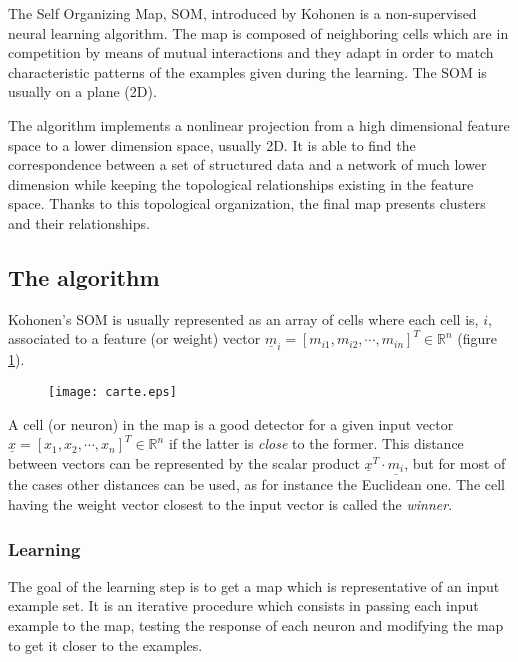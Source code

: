 The Self Organizing Map, SOM, introduced by Kohonen is a
non-supervised neural
learning algorithm. The map is composed of neighboring cells which are
in competition by means of mutual interactions and they adapt in order
to match characteristic patterns of the examples given during the
learning. The SOM is usually on a plane (2D).

The algorithm implements a nonlinear projection from a high
dimensional feature space to a lower dimension space, usually 2D. It
is able to find the correspondence between a set of structured data
and a network of much lower dimension while keeping the topological
relationships existing in the feature space. Thanks to this
topological organization, the final map presents clusters and their
relationships. 

\subsection{The algorithm}
Kohonen's SOM is usually represented as an array of cells where each
cell is, $i$, associated to a feature (or weight) vector  $\underline m_i = \left[m_{i1},m_{i2},\cdots,m_{in}\right]^T\in
\mathbb{R}^n$ (figure \ref{carte}).\\
\begin{figure}
\center
\texttt{[image: carte.eps]}
\label{carte}
\end{figure}

A cell (or neuron) in the map is a good detector for a given input
vector $\underline x = \left[x_{1},x_{2},\cdots,x_{n}\right]^T\in
\mathbb{R}^n$ if the latter is {\em close} to the former. This
distance between vectors can be represented by the scalar product 
$\underline{x}^T\cdot\underline{m_i}$, but for most of the cases other
distances can be used, as for instance the Euclidean one. The cell
having the weight vector closest to the input vector is called the
{\em winner}.

\subsubsection{Learning}
The goal of the learning step is to get a map which is representative
of an input example set. It is an iterative procedure which consists
in passing each input example to the map, testing the response of each
neuron and modifying the map to get it closer to the examples.

